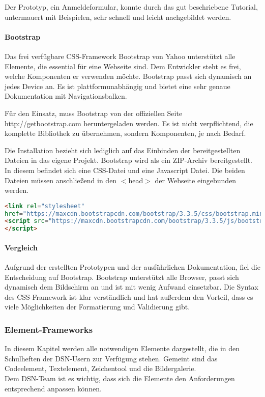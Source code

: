 Der Prototyp, ein Anmeldeformular, konnte durch das gut beschriebene Tutorial, untermauert mit Beispielen, sehr schnell und leicht nachgebildet werden.

\paragraph{Bootstrap}
Das frei verfügbare CSS-Framework Bootstrap von Yahoo unterstützt alle Elemente, die essential für eine Webseite sind. Dem Entwickler steht es frei, welche Komponenten er verwenden möchte. Bootstrap passt sich dynamisch an jedes Device an. Es ist plattformunabhängig und bietet eine sehr genaue Dokumentation mit Navigationsbalken.

Für den Einsatz, muss Bootstrap von der offiziellen Seite http://getbootstrap.com heruntergeladen werden. Es ist nicht verpflichtend, die komplette Bibliothek zu übernehmen, sondern Komponenten, je nach Bedarf.
 
Die Installation bezieht sich lediglich auf das Einbinden der bereitgestellten Dateien in das eigene Projekt. Bootstrap wird als ein ZIP-Archiv bereitgestellt. In diesem befindet sich eine CSS-Datei und eine Javascript Datei. Die beiden Dateien müssen anschließend in den $<$head$>$ der Webseite eingebunden werden. \cite{BOOTSTRAP}
\begin{lstlisting}[caption={Bootstrap einbinden \cite{BOOTSTRAP}}, language=HTML]
<link rel="stylesheet"
href="https://maxcdn.bootstrapcdn.com/bootstrap/3.3.5/css/bootstrap.min.css">
<script src="https://maxcdn.bootstrapcdn.com/bootstrap/3.3.5/js/bootstrap.min.js">
</script>
\end{lstlisting}

\paragraph{Vergleich}
Aufgrund der erstellten Prototypen und der ausführlichen Dokumentation, fiel die Entscheidung auf Bootstrap. Bootstrap unterstützt alle Browser, passt sich dynamisch dem Bildschirm an und ist mit wenig Aufwand einsetzbar. Die Syntax des CSS-Framework ist klar verständlich und hat außerdem den Vorteil, dass es viele Möglichkeiten der Formatierung und Validierung gibt.

\subsubsection{Element-Frameworks}
In diesem Kapitel werden alle notwendigen Elemente dargestellt, die in den Schulheften der DSN-Usern zur Verfügung stehen. Gemeint sind das Codeelement, Textelement, Zeichentool und die Bildergalerie.\\
Dem DSN-Team ist es wichtig, dass sich die Elemente den Anforderungen entsprechend anpassen können.

